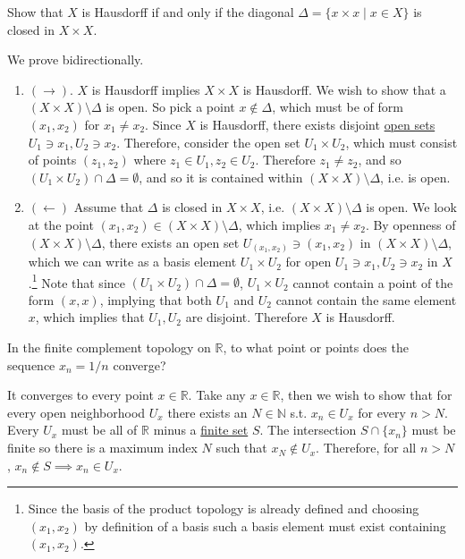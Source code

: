   \begin{exercise}[Munkres 17.13]
    Show that $X$ is Hausdorff if and only if the diagonal $\Delta = \{x \times x \mid x \in X\}$ is closed in $X \times X$.
  \end{exercise}
  \begin{solution}
    We prove bidirectionally. 
    \begin{enumerate}
      \item $(\rightarrow)$. $X$ is Hausdorff implies $X \times X$ is Hausdorff. We wish to show that a $(X \times X) \setminus \Delta$ is open. So pick a point $x \not\in \Delta$, which must be of form $(x_1, x_2)$ for $x_1 \neq x_2$. Since $X$ is Hausdorff, there exists disjoint \hyperref[def:open-set]{open sets} $U_1 \ni x_1, U_2 \ni x_2$. Therefore, consider the open set $U_1 \times U_2$, which must consist of points $(z_1, z_2)$ where $z_1 \in U_1, z_2 \in U_2$. Therefore $z_1 \neq z_2$, and so $(U_1 \times U_2) \cap \Delta = \emptyset$, and so it is contained within $(X \times X) \setminus \Delta$, i.e. is open. 

      \item $(\leftarrow)$ Assume that $\Delta$ is closed in $X \times X$, i.e. $(X \times X) \setminus \Delta$ is open. We look at the point $(x_1, x_2) \in (X \times X) \setminus \Delta$, which implies $x_1 \neq x_2$. By openness of $(X \times X) \setminus \Delta$, there exists an open set $U_{(x_1, x_2)} \ni (x_1, x_2)$ in $(X \times X) \setminus \Delta$, which we can write as a basis element $U_1 \times U_2$ for open $U_1 \ni x_1, U_2 \ni x_2$ in $X$.\footnote{Since the basis of the product topology is already defined and choosing $(x_1, x_2)$ by definition of a basis such a basis element must exist containing $(x_1, x_2)$.} Note that since $(U_1 \times U_2) \cap \Delta = \emptyset$, $U_1 \times U_2$ cannot contain a point of the form $(x, x)$, implying that both $U_1$ and $U_2$ cannot contain the same element $x$, which implies that $U_1, U_2$ are disjoint. Therefore $X$ is Hausdorff. 
    \end{enumerate} 

  \end{solution}

  \begin{exercise}[Munkres 17.14]
    In the finite complement topology on $\mathbb{R}$, to what point or points does the sequence $x_n = 1/n$ converge?
  \end{exercise}
  \begin{solution}
    It converges to every point $x \in \mathbb{R}$. Take any $x \in \mathbb{R}$, then we wish to show that for every open neighborhood $U_x$ there exists an $N \in \mathbb{N}$ s.t. $x_n \in U_x$ for every $n > N$. Every $U_x$ must be all of $\mathbb{R}$ minus a \hyperref[st-def:finite-set]{finite set} $S$. The intersection $S \cap \{x_n\}$ must be finite so there is a maximum index $N$ such that $x_N \not\in U_x$. Therefore, for all $n > N$, $x_n \not\in S \implies x_n \in U_x$. 
  \end{solution}

